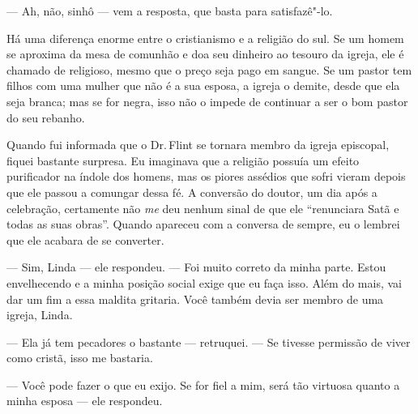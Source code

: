 --- Ah, não, sinhô --- vem a resposta, que basta para satisfazê"-lo.



Há
uma diferença enorme entre o cristianismo e a religião do sul. Se um
homem se aproxima da mesa de comunhão e doa seu dinheiro ao tesouro da
igreja, ele é chamado de religioso, mesmo que o preço seja pago em
sangue. Se um pastor tem filhos com uma mulher que não é a sua esposa, a
igreja o demite, desde que ela seja branca; mas se for negra, isso não o
impede de continuar a ser o bom pastor do seu rebanho.

Quando fui informada que o Dr.\,Flint se
tornara membro da igreja episcopal, fiquei bastante surpresa. Eu
imaginava que a religião possuía um efeito purificador na índole dos
homens, mas os piores assédios que sofri vieram depois que ele passou a
comungar dessa fé. A conversão do doutor, um dia após a celebração,
certamente não \emph{me} deu nenhum sinal de que ele ``renunciara Satã e
todas as suas obras''. Quando apareceu com a conversa de sempre, eu o
lembrei que ele acabara de se converter.

--- Sim, Linda --- ele respondeu. --- Foi muito correto da minha parte.
Estou envelhecendo e a minha posição social exige que eu faça isso. Além
do mais, vai dar um fim a essa maldita gritaria. Você também devia ser
membro de uma igreja, Linda.

--- Ela já tem pecadores o bastante ---
retruquei. --- Se tivesse permissão de viver como cristã, isso me
bastaria.

--- Você pode fazer o que eu exijo. Se
for fiel a mim, será tão virtuosa quanto a minha esposa --- ele
respondeu.

